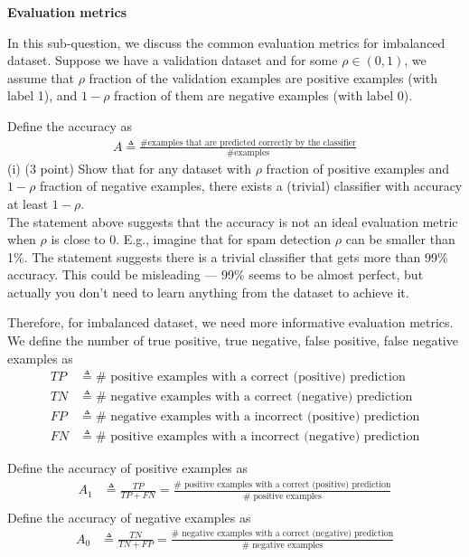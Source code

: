 \item {} \textbf{Evaluation metrics}

In this sub-question, we discuss the common evaluation metrics for imbalanced dataset. Suppose we have a validation dataset and for some $\rho \in (0,1)$, we assume that $\rho$ fraction of the validation examples are positive examples (with label 1), and $1-\rho$ fraction of them are negative examples (with label 0). 


Define the accuracy as
\begin{align*}
A \triangleq %
\frac{\# \textrm{examples that are predicted correctly by the classifier}}{\# \textrm{examples}} 
\end{align*}
(i) (3 point) Show that for any dataset with $\rho$ fraction of positive examples and $1-\rho$ fraction of negative examples, there exists a (trivial) classifier with accuracy at least $1-\rho$. 
\newline
\\
The statement above suggests that the accuracy is not an ideal evaluation metric when $\rho$ is close to 0. E.g., imagine that for spam detection $\rho$ can be smaller than 1\%. The statement suggests there is a trivial classifier that gets more than 99\% accuracy. This could be misleading ---  99\% seems to be almost perfect, but actually you don't need to learn anything from the dataset to achieve it. 

Therefore, for imbalanced dataset, we need more informative evaluation metrics. We define the number of true positive, true negative, false positive, false negative examples as
\begin{align*}
TP & \triangleq \# \textrm{ positive examples with a correct (positive) prediction} \\
TN & \triangleq \# \textrm{ negative examples with a correct (negative) prediction} \\
FP & \triangleq \# \textrm{ negative examples with a incorrect (positive) prediction} \\
FN & \triangleq \# \textrm{ positive examples with a incorrect (negative) prediction} 
\end{align*}

Define the accuracy of positive examples  as 
\newcommand{\recall}{\textup{recall}}
\begin{align*}
A_1 &\triangleq \frac{TP}{TP + FN} = \frac{\#  \textrm{ positive examples with a correct (positive) prediction}}{\# \textrm{ positive examples}}\nonumber\\
\end{align*}
Define the accuracy of negative examples as 
\begin{align*}
A_0 & \triangleq \frac{TN}{TN + FP} = \frac{\#  \textrm{ negative examples with a correct (negative) prediction}}{\# \textrm{ negative examples}}
\end{align*}


